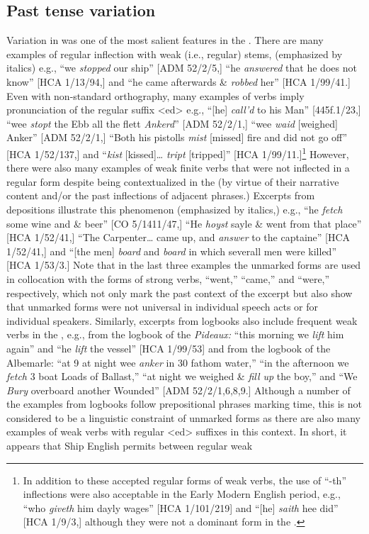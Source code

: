 \subsection{{Past} {tense} {variation} }%

  Variation in  was one of the most salient features in the . There are many examples of regular inflection with weak (i.e., regular)  stems, (emphasized by italics) e.g., “we \textit{stopped} our ship” [ADM 52/2/5,] “he \textit{answered} that he does not know” [HCA 1/13/94,] and “he came afterwards \&  \textit{robbed} her” [HCA 1/99/41.] Even with non-standard orthography, many examples of verbs imply pronunciation of the regular  suffix <ed> e.g., “[he] \textit{call’d} to his Man” [445f.1/23,] “wee \textit{stopt} the Ebb all the flett \textit{Ankerd}” [ADM 52/2/1,] “wee \textit{waid} [weighed] Anker” [ADM 52/2/1,] “Both his pistolls \textit{mist} [missed] fire and did not go off” [HCA 1/52/137,] and “\textit{kist} [kissed]… \textit{tript} [tripped]” [HCA 1/99/11.]\footnote{In addition to these accepted regular forms of  weak verbs, the use of “-th” inflections were also acceptable in the Early Modern English period, e.g., “who \textit{giveth} him dayly wages” [HCA 1/101/219] and “[he] \textit{saith} hee did” [HCA 1/9/3,] although they were not a dominant form in the .} However, there were also many examples of weak finite verbs that were not inflected in a regular  form despite being contextualized in the  (by virtue of their narrative content and/or the past inflections of adjacent  phrases.) Excerpts from depositions illustrate this phenomenon (emphasized by italics,) e.g., “he \textit{fetch} some wine and \& beer” [CO 5/1411/47,] “He \textit{hoyst} sayle \& went from that place” [HCA 1/52/41,] “The Carpenter… came up, and \textit{answer} to the captaine” [HCA 1/52/41,] and “[the men] \textit{board} and \textit{board} in which severall men were killed” [HCA 1/53/3.] Note that in the last three examples the unmarked forms are used in collocation with the  forms of strong verbs, “went,” “came,” and “were,” respectively, which not only mark the past context of the excerpt but also show that unmarked forms were not universal in individual speech acts or for individual speakers. Similarly, excerpts from logbooks also include frequent  weak verbs in the , e.g., from the logbook of the \textit{Pideaux:} “this morning we \textit{lift} him again” and “he \textit{lift} the vessel” [HCA 1/99/53] and from the logbook of the Albemarle: “at 9 at night wee \textit{anker} in 30 fathom water,” “in the afternoon we \textit{fetch} 3 boat Loads of Ballast,” “at night we weighed \& \textit{fill up} the boy,” and “We \textit{Bury} overboard another Wounded” [ADM 52/2/1,6,8,9.] Although a number of the examples from logbooks follow prepositional phrases marking time, this is not considered to be a linguistic constraint of unmarked  forms as there are also many examples of weak verbs with regular <ed> suffixes in this context. In short, it appears that Ship English permits  between regular weak 